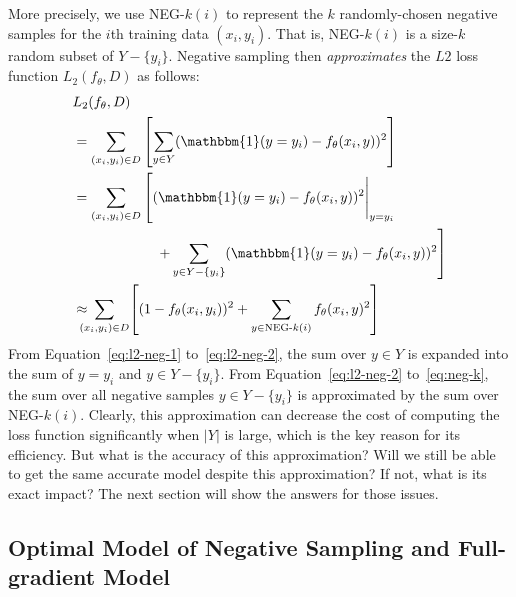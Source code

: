 More precisely, we use NEG-$k(i)$ to represent the $k$ randomly-chosen negative samples for the $i$th training data $(x_i, y_i)$. 
That is, NEG-$k(i)$ is a size-$k$ random subset of $Y - \{y_i\}$. Negative sampling then \emph{approximates} the $L2$ loss function $L_2(f_{\theta},D)$ as follows:
\begin{align} 
& L_2(f_{\theta},D) \nonumber\\ 
& =\sum_{(x_i,y_i)\in D} \left[  \sum_{y \in Y} (\mathbbm{1}(y=y_i) - f_{\theta}(x_i, y))^2\right] \label{eq:l2-neg-1}\\
& =\sum_{(x_i,y_i)\in D} \left[ (\mathbbm{1}(y=y_i) - f_{\theta}(x_i, y))^2 \Bigg|_{y=y_i} \right. \nonumber\\
&                           \left. \qquad\qquad\;\;\;\;\;\;\; +\sum_{y \in Y - \{y_i\}} (\mathbbm{1}(y=y_i) - f_{\theta}(x_i, y))^2\right] \label{eq:l2-neg-2}\\
& \approx \!\!\!\!\!\sum_{(x_i,y_i)\in D}\!\left[ (1 - f_{\theta}(x_i, y_i))^2  + \sum_{y \in \text{NEG-$k$}(i)} f_{\theta}(x_i, y)^2 \right] \label{eq:neg-k}
\end{align}
From Equation~\ref{eq:l2-neg-1} to~\ref{eq:l2-neg-2}, the sum over $y \in Y$ is expanded into the sum of $y = y_i$ and $y \in Y - \{y_i\}$. From Equation~\ref{eq:l2-neg-2} to~\ref{eq:neg-k}, the sum over all negative samples $y \in Y - \{y_i\}$ is approximated by the sum over NEG-$k(i)$.
Clearly, this approximation can decrease the cost of computing the loss function significantly when $|Y|$ is large, which is the key reason for its efficiency. But what is the accuracy of this approximation? Will we still be able to get the same accurate model despite this approximation? If not, what is its exact impact? The next section will show the answers for those issues.

\subsection{Optimal Model of Negative Sampling and Full-gradient  Model}

